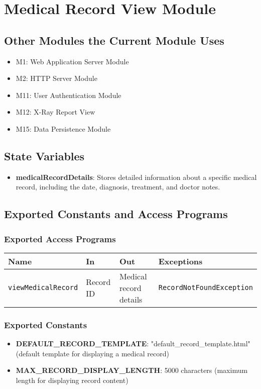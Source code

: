 \documentclass[12pt, titlepage]{article}
\begin{document}
\section{Medical Record View Module}

\subsection{Other Modules the Current Module Uses}
\begin{itemize}
\item M1: Web Application Server Module
\item M2: HTTP Server Module
\item M11: User Authentication Module
\item M12: X-Ray Report View
\item M15: Data Persistence Module
\end{itemize}

\subsection{State Variables}
\begin{itemize}
\item \textbf{medicalRecordDetails}: Stores detailed information about a specific medical record, including the date, diagnosis, treatment, and doctor notes.
\end{itemize}

\subsection{Exported Constants and Access Programs}
\subsubsection{Exported Access Programs}
\begin{tabular}{|l|l|l|l|}
    \hline
    \textbf{Name} & \textbf{In} & \textbf{Out} & \textbf{Exceptions} \\
    \hline 
    \texttt{viewMedicalRecord} & Record ID & Medical record details & \texttt{RecordNotFoundException} \\
    \hline
\end{tabular}

\subsubsection{Exported Constants}
\begin{itemize}
\item \textbf{DEFAULT\_RECORD\_TEMPLATE}: "default\_record\_template.html" (default template for displaying a medical record)
\item \textbf{MAX\_RECORD\_DISPLAY\_LENGTH}: 5000 characters (maximum length for displaying record content)
\end{itemize}
\end{document}
